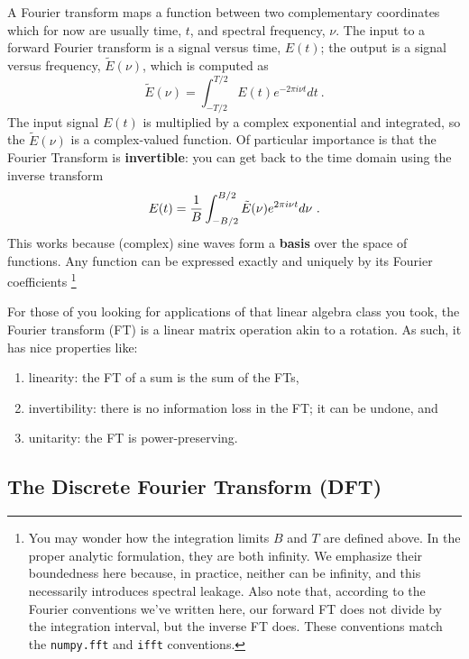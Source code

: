 \documentclass[11pt,preprint]{aastex}
\begin{document}
\noindent
A Fourier transform maps a function between two complementary coordinates which
for now are usually time, $t$, and spectral frequency, $\nu$.
The input to a forward Fourier transform is a signal versus time, 
$E(t)$; the output is a signal versus frequency, $\tilde E(\nu)$,
which is computed as
% 
\begin{equation}
\tilde E(\nu) = \int_{-T/2}^{T/2} E(t) e^{-2 \pi i \nu t} dt \ .
\label{eq:dft}
\end{equation}
% 
\noindent The input signal $E(t)$ is multiplied by a complex
exponential and integrated, so the $\tilde E(\nu)$ is a complex-valued function. Of particular
importance is that the Fourier Transform is {\bf invertible}: 
you can get back to the time domain using the inverse transform
%
\begin{equation}
E(t) = {1 \over B} \int_{-B/2}^{B/2} \tilde E(\nu) e^{2 \pi i \nu t} d\nu \ .
\end{equation}
% 
This works because (complex) sine waves form a {\bf basis} over the space of functions.
Any function can be expressed exactly and uniquely by its Fourier coefficients
\footnote{You may wonder how
the integration limits $B$ and $T$ are defined above. In the proper
analytic formulation, they are both infinity. We emphasize their
boundedness here because, in practice, 
neither can be infinity, and this necessarily introduces spectral leakage. Also note that,
according to the Fourier conventions we've written here, our forward FT does not divide
by the integration interval, but the inverse FT does.  These conventions match 
the {\tt numpy.fft}
and {\tt ifft} conventions.}

For those of you looking for applications of that linear algebra class you took,
the Fourier transform (FT) is a linear matrix operation akin to a rotation. 
As such, it has nice properties like:
\begin{enumerate}
\item linearity: the FT
of a sum is the sum of the FTs, 
\item invertibility: there is no information loss in the FT; it can be undone, and 
\item unitarity: the FT is power-preserving.
\end{enumerate}


\subsection{The Discrete Fourier Transform (DFT)} \label{dft}
\end{document}
